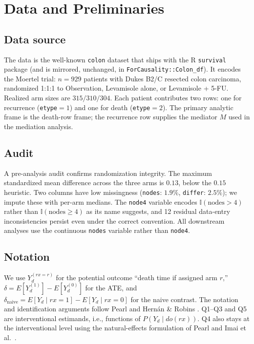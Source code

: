 \documentclass[conference]{IEEEtran}
\begin{document}
\section{Data and Preliminaries}

\subsection{Data source}

The data is the well-known \texttt{colon} dataset that ships with the R \texttt{survival} package (and is mirrored, unchanged, in \texttt{ForCausality::Colon\_df}). It encodes the Moertel trial: $n = 929$ patients with Dukes B2/C resected colon carcinoma, randomized 1:1:1 to Observation, Levamisole alone, or Levamisole + 5-FU. Realized arm sizes are $315 / 310 / 304$. Each patient contributes two rows: one for recurrence (\texttt{etype}$=1$) and one for death (\texttt{etype}$=2$). The primary analytic frame is the death-row frame; the recurrence row supplies the mediator $M$ used in the mediation analysis.

\subsection{Audit}

A pre-analysis audit confirms randomization integrity. The maximum standardized mean difference across the three arms is $0.13$, below the $0.15$ heuristic. Two columns have low missingness (\texttt{nodes}: $1.9\%$, \texttt{differ}: $2.5\%$); we impute these with per-arm medians. The \texttt{node4} variable encodes $\mathbb{I}(\text{nodes} > 4)$ rather than $\mathbb{I}(\text{nodes} \geq 4)$ as its name suggests, and 12 residual data-entry inconsistencies persist even under the correct convention. All downstream analyses use the continuous \texttt{nodes} variable rather than \texttt{node4}.

\subsection{Notation}

We use $Y_d^{(rx{=}r)}$ for the potential outcome ``death time if assigned arm $r$,'' $\delta = E[Y_d^{(1)}] - E[Y_d^{(0)}]$ for the ATE, and $\delta_\text{naive} = E[Y_d \mid rx{=}1] - E[Y_d \mid rx{=}0]$ for the naive contrast. The notation and identification arguments follow Pearl \cite{pearl2009} and Hernán \& Robins \cite{hernan2020}. Q1--Q3 and Q5 are interventional estimands, i.e., functions of $P(Y_d \mid do(rx))$. Q4 also stays at the interventional level using the natural-effects formulation of Pearl \cite{pearl2001} and Imai et al.\ \cite{imai2010}.
\end{document}
